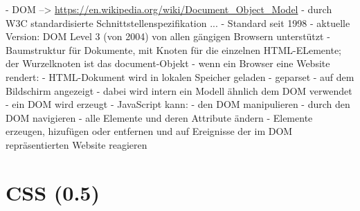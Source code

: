 \documentclass[a4paper, 12pt, listof=totoc, bibliography=totoc]{scrreprt}
\begin{document}
- DOM  --> \url{https://en.wikipedia.org/wiki/Document_Object_Model}
	- durch W3C standardisierte Schnittstellenspezifikation ...
	- Standard seit 1998
	- aktuelle Version: DOM Level 3 (von 2004) von allen gängigen Browsern unterstützt
	- Baumstruktur für Dokumente, mit Knoten für die einzelnen HTML-ELemente; der Wurzelknoten ist das document-Objekt
	- wenn ein Browser eine Website rendert:
		- HTML-Dokument wird in lokalen Speicher geladen
		- geparset
		- auf dem Bildschirm angezeigt
		- dabei wird intern ein Modell ähnlich dem DOM verwendet
		- ein DOM wird erzeugt
	- JavaScript kann:
		- den DOM manipulieren
		- durch den DOM navigieren
		- alle Elemente und deren Attribute ändern
		- Elemente erzeugen, hizufügen oder entfernen und auf Ereignisse der im DOM repräsentierten Website reagieren



\section{CSS (0.5)}
\end{document}
